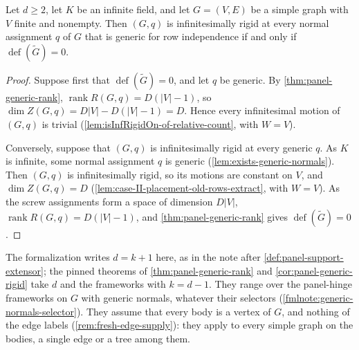 \begin{corollary}
  \label{cor:panel-generic-rigid}
  \leanok
  Let $d \ge 2$, let $K$ be an infinite field, and let $G = (V, E)$ be
  a simple graph with $V$ finite and nonempty. Then $(G, q)$ is
  infinitesimally rigid at every normal assignment $q$ of $G$ that is
  generic for row independence if and only if
  $\operatorname{def}(\tilde G) = 0$.
\end{corollary}
\begin{proof}
  \leanok
  Suppose first that $\operatorname{def}(\tilde G) = 0$, and let $q$ be
  generic. By \cref{thm:panel-generic-rank},
  $\operatorname{rank} R(G,q) = D(|V|-1)$, so
  $\dim Z(G,q) = D|V| - D(|V|-1) = D$. Hence every infinitesimal
  motion of $(G, q)$ is trivial
  (\cref{lem:isInfRigidOn-of-relative-count}, with $W = V$).

  Conversely, suppose that $(G, q)$ is infinitesimally rigid at every
  generic $q$. As $K$ is infinite, some normal assignment $q$ is
  generic (\cref{lem:exists-generic-normals}). Then $(G, q)$ is
  infinitesimally rigid, so its motions are constant on $V$, and
  $\dim Z(G,q) = D$ (\cref{lem:case-II-placement-old-rows-extract},
  with $W = V$). As the screw assignments form a space of dimension
  $D|V|$, $\operatorname{rank} R(G,q) = D(|V|-1)$, and
  \cref{thm:panel-generic-rank} gives
  $\operatorname{def}(\tilde G) = 0$.
\end{proof}

\begin{fmlnote}
  The formalization writes $d = k + 1$ here, as in the note after
  \cref{def:panel-support-extensor}; the pinned theorems of
  \cref{thm:panel-generic-rank} and \cref{cor:panel-generic-rigid}
  take $d$ and the frameworks with $k = d - 1$. They range over the
  panel-hinge frameworks on $G$ with generic normals, whatever their
  selectors (\cref{fmlnote:generic-normals-selector}). They assume
  that every body is a vertex of $G$, and nothing of the edge labels
  (\cref{rem:fresh-edge-supply}): they apply to every simple graph on
  the bodies, a single edge or a tree among them.
\end{fmlnote}

